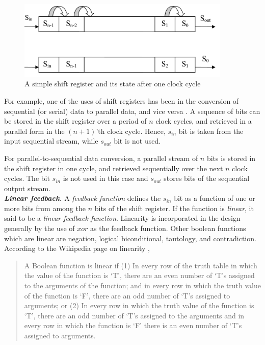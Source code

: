 \begin{figure}[ht!]
	\centering
		\includegraphics[width=4in]{./figures/shift-register.PNG}
	\caption{A simple shift register and its state after one clock cycle}	
	\label{fig:shift-register}
\end{figure}

For example, one of the uses of shift registers has been in the conversion of sequential (or serial) data to parallel data, and vice versa \cite{lfsr-link}. A sequence of bits can be stored in the shift register over a period of $n$ clock cycles, and retrieved in a parallel form in the $(n+1)$'th clock cycle. Hence, $s_{in}$ bit is taken from the input sequential stream, while $s_{out}$ bit is not used. 

For parallel-to-sequential data conversion, a parallel stream of $n$ bits is stored in the shift register in one cycle, and retrieved sequentially over the next $n$ clock cycles. The bit $s_{in}$ is not used in this case and $s_{out}$ stores bits of the sequential output stream.\\

\noindent \textbf{\emph{Linear feedback.}} A \textit{feedback function} defines the $s_{in}$ bit as a function of one or more bits from among the $n$ bits of the shift register. If the function is \textit{linear}, it said to be a \textit{linear feedback function}. Linearity is incorporated in the design generally by the use of $xor$ as the feedback function. Other boolean functions which are linear are negation, logical biconditional, tautology, and contradiction. According to the Wikipedia page on linearity \cite{linear-wiki}, 
\begin{quote}
\footnotesize{A Boolean function is linear if (1) In every row of the truth table in which the value of the function is `T', there are an even number of `T's assigned to the arguments of the function; and in every row in which the truth value of the function is `F', there are an odd number of `T's assigned to arguments; or (2) In every row in which the truth value of the function is `T', there are an odd number of `T's assigned to the arguments and in every row in which the function is `F' there is an even number of `T's assigned to arguments.
}
\end{quote}

